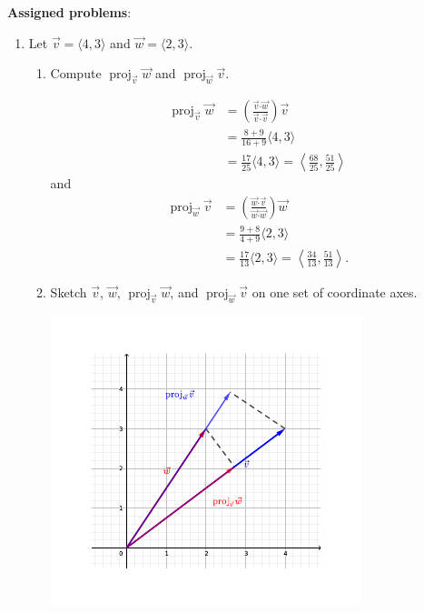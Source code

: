 \documentclass[12pt]{article}
\newcommand{\dotp}{\boldsymbol{\cdot}}
\DeclareMathOperator{\proj}{proj}
\begin{document}
\newpage
\textbf{Assigned problems}:
  \begin{enumerate}
    \item Let $\vec{v} = \langle 4,3\rangle$ and $\vec{w} = \langle 2,3\rangle$.
    \begin{multicols}{2}
    \begin{enumerate}
    \item Compute $\proj_{\vec{v}}\vec{w}$ and $\proj_{\vec{w}}\vec{v}$.
    
    \begin{align*}
    \proj_{\vec{v}}\vec{w}& = \left(\frac{\vec{v}\dotp\vec{w}}{\vec{v}\dotp\vec{v}}\right)\vec{v}\\
    & = \frac{8+9}{16+9}\langle 4,3\rangle\\
    & = \frac{17}{25}\langle 4,3\rangle = \left\langle \frac{68}{25},\frac{51}{25}\right\rangle
    \end{align*}
    and
    \begin{align*}
    \proj_{\vec{w}}\vec{v}&=\left(\frac{\vec{w}\dotp\vec{v}}{\vec{w}\dotp\vec{w}}\right)\vec{w}\\
    & = \frac{9+8}{4+9}\langle 2,3\rangle\\
    &=\frac{17}{13}\langle 2,3\rangle = \left\langle \frac{34}{13},\frac{51}{13}\right\rangle.
    \end{align*}
    \columnbreak
    \item Sketch $\vec{v}$, $\vec{w}$, $\proj_{\vec{v}}\vec{w}$, and $\proj_{\vec{w}}\vec{v}$ on one set of coordinate axes.
    \begin{center}
    \includegraphics[width=\columnwidth]{T3-1}
    \end{center}
    \end{enumerate}
    \end{multicols}
   

\end{enumerate}
\end{document}
